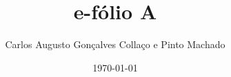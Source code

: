 \documentclass[12pt,a4paper]{article}
\author{Carlos Augusto Gonçalves Collaço e Pinto Machado}
\title{e-fólio A}
\date{\today}
\begin{document}


\newpage



{}

\end{document}
